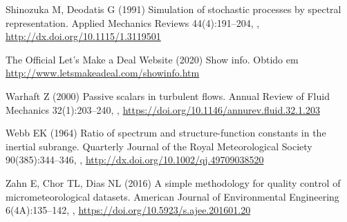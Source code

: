 \documentclass{svjour3}                     %
\begin{document}
\begin{thebibliography}{26}
Shinozuka M, Deodatis G (1991) Simulation of stochastic processes by spectral
  representation. Applied Mechanics Reviews 44(4):191--204,
  , \urlprefix\url{http://dx.doi.org/10.1115/1.3119501}

{The Official Let's Make a Deal Website} (2020) Show info. Obtido em
  \url{http://www.letsmakeadeal.com/showinfo.htm}

Warhaft Z (2000) Passive scalars in turbulent flows. Annual Review of Fluid
  Mechanics 32(1):203--240, ,
  \urlprefix\url{https://doi.org/10.1146/annurev.fluid.32.1.203}

Webb EK (1964) Ratio of spectrum and structure-function constants in the
  inertial subrange. Quarterly Journal of the Royal Meteorological Society
  90(385):344--346, ,
  \urlprefix\url{http://dx.doi.org/10.1002/qj.49709038520}

Zahn E, Chor TL, Dias NL (2016) A simple methodology for quality control of
  micrometeorological datasets. American Journal of Environmental Engineering
  6(4A):135--142, ,
  \urlprefix\url{https://doi.org/10.5923/s.ajee.201601.20}

\end{thebibliography}
\end{document}
